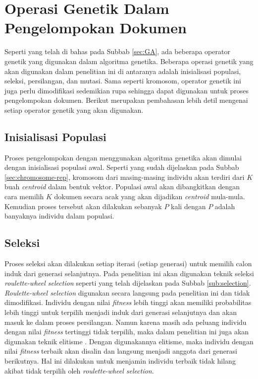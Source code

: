 \section{Operasi Genetik Dalam Pengelompokan Dokumen}
Seperti yang telah di bahas pada Subbab \ref{sec:GA}, ada beberapa operator genetik yang digunakan dalam algoritma genetika. Beberapa operasi genetik yang akan digunakan dalam penelitian ini di antaranya adalah inisialisasi populasi, seleksi, persilangan, dan mutasi. Sama seperti kromosom, operator genetik ini juga perlu dimodifikasi sedemikian rupa sehingga dapat digunakan untuk proses pengelompokan dokumen. Berikut merupakan pembahasan lebih detil mengenai setiap operator genetik yang akan digunakan.

\subsection{Inisialisasi Populasi}
Proses pengelompokan dengan menggunakan algoritma genetika akan dimulai dengan inisialisasi populasi awal. Seperti yang sudah dijelaskan pada Subbab \ref{sec:chromosome-rep}, kromosom dari masing-masing individu akan terdiri dari $K$ buah \textit{centroid} dalam bentuk vektor. Populasi awal akan dibangkitkan dengan cara memilih $K$ dokumen secara acak yang akan dijadikan \textit{centroid} mula-mula. Kemudian proses tersebut akan dilakukan sebanyak $P$ kali dengan $P$ adalah banyaknya individu dalam populasi.

\subsection{Seleksi}
Proses seleksi akan dilakukan setiap iterasi (setiap generasi) untuk memilih calon induk dari generasi selanjutnya. Pada penelitian ini akan digunakan teknik seleksi \textit{roulette-wheel selection} seperti yang telah dijelaskan pada Subbab \ref{sub:selection}. \textit{Roulette-wheel selection} digunakan secara langsung pada penelitian ini dan tidak dimodifikasi. Individu dengan nilai \textit{fitness} lebih tinggi akan memiliki probabilitas lebih tinggi untuk terpilih menjadi induk dari generasi selanjutnya dan akan masuk ke dalam proses persilangan. Namun karena masih ada peluang individu dengan nilai \textit{fitness} tertinggi tidak terpilih, maka dalam penelitian ini juga akan digunakan teknik elitisme \cite{ahn2003elitism}. Dengan digunakannya elitisme, maka individu dengan nilai \textit{fitness} terbaik akan disalin dan langsung menjadi anggota dari generasi berikutnya. Hal ini dilakukan untuk menjamin individu terbaik tidak hilang akibat tidak terpilih oleh \textit{roulette-wheel selection}.

